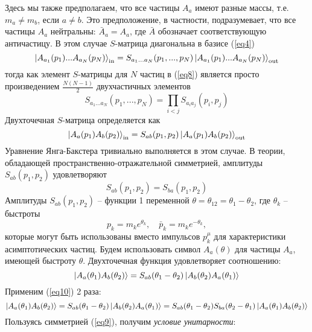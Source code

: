 \documentclass[12pt]{article}
\theoremstyle{definition}
\begin{document}
Здесь мы также предполагаем, что все частицы $A_a$ имеют разные массы, т.е. $m_a\neq m_b$, если $a\neq b$. Это предположение, в частности, подразумевает, что все частицы $A_a$ нейтральны: $\bar{A}_a = A_a$, где $\bar{A}$ обозначает соответствующую античастицу. В этом случае $S$-матрица диагональна в базисе (\ref{eq4})
\begin{equation}\label{eq8}
    \ket{A_{a_1}(p_1)...A_{a_N}(p_N)}_{\text{in}}=S_{a_1...a_N}(p_1,...,p_N)\ket{A_{a_1}(p_1)...A_{a_N}(p_N)}_{\text{out}}
\end{equation}
тогда как элемент $S$-матрицы для $N$ частиц в (\ref{eq8}) является просто произведением $\frac{N(N - 1)}{2}$ двухчастичных элементов
\begin{equation}
    S_{a_1...a_N}(p_1,...,p_N)=\prod\limits_{i<j}S_{a_ia_j}(p_i,p_j)
\end{equation}
Двухточечная $S$-матрица определяется как
\begin{equation}\label{eq17}
    \ket{A_a(p_1)A_b(p_2)}_{\text{in}}=S_{ab}(p_1,p_2)\ket{A_a(p_1)A_b(p_2)}_{\text{out}}
\end{equation}
Уравнение Янга-Бакстера тривиально выполняется в этом случае. В теории, обладающей пространственно-отражательной симметрией, амплитуды $S_{ab}(p_1,p_2)$ удовлетворяют
\begin{equation}\label{eq9}
    S_{ab}(p_1,p_2)=S_{ba}(p_1,p_2)
\end{equation}
Амплитуды $S_{ab}(p_1,p_2)$ -- функции 1 переменной $\theta=\theta_{12}=\theta_1-\theta_2$, где $\theta_k$ -- быстроты
\begin{equation}
    p_k=m_ke^{\theta_k},\quad\bar{p}_k=m_ke^{-\theta_k},
\end{equation}
которые могут быть использованы вместо импульсов $p_k^\mu$ для характеристики асимптотических частиц. Будем использовать символ $A_a(\theta)$ для частицы $A_a$, имеющей быстроту $\theta$. Двухточечная функция удовлетворяет соотношению:
\begin{equation}\label{eq10}
    \ket{A_a(\theta_1)A_b(\theta_2)}=S_{ab}(\theta_1-\theta_2)\ket{A_b(\theta_2)A_a(\theta_1)}   
\end{equation}
Применим (\ref{eq10}) 2 раза:
\begin{equation}
    \ket{A_a(\theta_1)A_b(\theta_2)}=S_{ab}(\theta_1-\theta_2)\ket{A_b(\theta_2)A_a(\theta_1)}=S_{ab}(\theta_1-\theta_2)S_{ba}(\theta_2-\theta_1)\ket{A_a(\theta_1)A_b(\theta_2)}
\end{equation}
Пользуясь симметрией  (\ref{eq9}), получим \textit{условие унитарности}:
\end{document}
